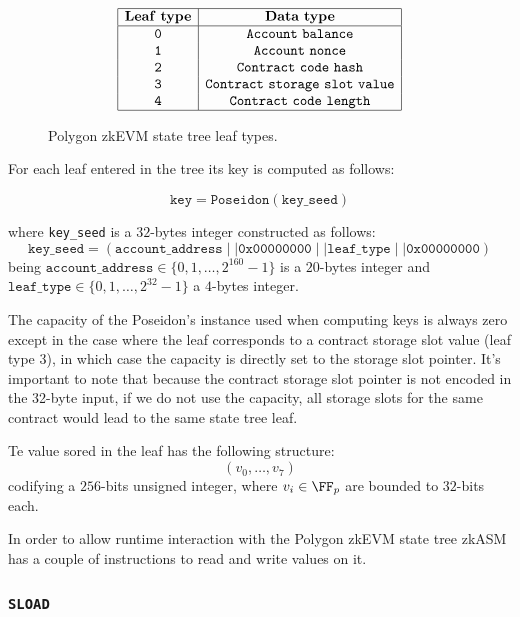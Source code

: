 \begin{figure}[h!]
\renewcommand{\figurename}{Table}
\[
\begin{array}{|c|c|}
\hline
\mathbf{Leaf~type} &\mathbf{Data~type} \\ \hline
\mathtt{0} & \mathtt{Account~balance} \\
\mathtt{1} & \mathtt{Account~nonce} \\
\mathtt{2} & \mathtt{Contract~code~hash} \\
\mathtt{3} & \mathtt{Contract~storage~slot~value} \\
\mathtt{4} & \mathtt{Contract~code~length} \\
\hline
\end{array}
\]
\caption{Polygon zkEVM state tree leaf types.}
\label{tab:memory-first-example}
\end{figure}


For each leaf entered in the tree its key is computed as follows:

$$\texttt{key} = \texttt{Poseidon}(\texttt{key\_seed})$$

where \texttt{key\_seed} is a $32$-bytes integer constructed as follows:
\[
\texttt{key\_seed} = (\texttt{account\_address} \mid\mid \texttt{0x00000000} \mid\mid \texttt{leaf\_type} \mid\mid \texttt{0x00000000})
\]
being $\texttt{account\_address} \in \{0, 1, \dots, 2^{160} - 1\}$ is a $20$-bytes integer and $\texttt{leaf\_type} \in \{0, 1, \dots, 2^{32} - 1\}$ a $4$-bytes integer.

The capacity of the Poseidon's instance used when computing keys is always zero except in the case where the leaf corresponds to a contract storage slot value (leaf type 3), in which case the capacity is directly set to the storage slot pointer. It's important to note that because the contract storage slot pointer is not encoded in the 32-byte input, if we do not use the capacity, all storage slots for the same contract would lead to the same state tree leaf.

Te value sored in the leaf has the following structure:
\[
(v_0, \dots, v_7)
\]
codifying a $256$-bits unsigned integer, where $v_i \in \FF_p$ are bounded to $32$-bits each. 

In order to allow runtime interaction with the Polygon zkEVM state tree zkASM has a couple of instructions to read and write values on it.

\subsubsection{\texttt{SLOAD}}

